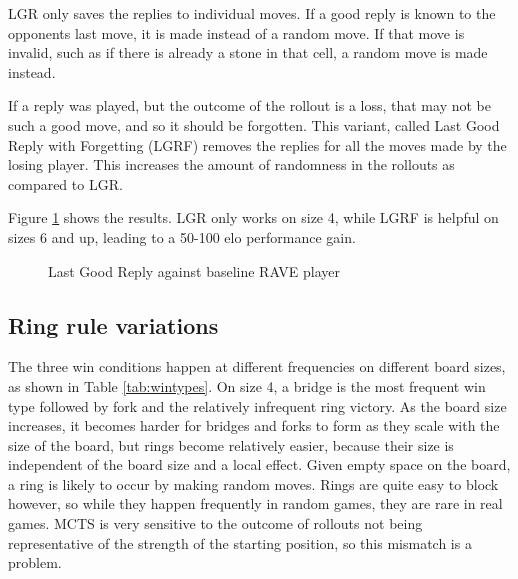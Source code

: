 LGR only saves the replies to individual moves. If a good reply is known to the opponents last move, it is made instead of a random move. If that move is invalid, such as if there is already a stone in that cell, a random move is made instead.

If a reply was played, but the outcome of the rollout is a loss, that may not be such a good move, and so it should be forgotten. This variant, called Last Good Reply with Forgetting (LGRF) removes the replies for all the moves made by the losing player. This increases the amount of randomness in the rollouts as compared to LGR.

Figure \ref{fig:lgr} shows the results. LGR only works on size 4, while LGRF is helpful on sizes 6 and up, leading to a 50-100 elo performance gain.

\begin{figure}
	\centering
{}
	\caption{Last Good Reply against baseline RAVE player}
	\label{fig:lgr}
\end{figure}


\subsection{Ring rule variations}

The three win conditions happen at different frequencies on different board sizes, as shown in Table \ref{tab:wintypes}. On size 4, a bridge is the most frequent win type followed by fork and the relatively infrequent ring victory. As the board size increases, it becomes harder for bridges and forks to form as they scale with the size of the board, but rings become relatively easier, because their size is independent of the board size and a local effect. Given empty space on the board, a ring is likely to occur by making random moves. Rings are quite easy to block however, so while they happen frequently in random games, they are rare in real games. MCTS is very sensitive to the outcome of rollouts not being representative of the strength of the starting position, so this mismatch is a problem.

